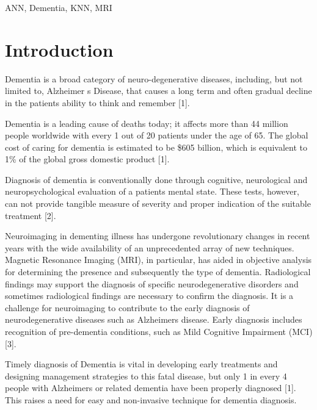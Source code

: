 \documentclass[journal,twoside]{IEEEtran}
\begin{document}
\begin{IEEEkeywords}
ANN, Dementia, KNN, MRI
\end{IEEEkeywords}


%
\IEEEpeerreviewmaketitle

\section{Introduction}
Dementia is a broad category of neuro-degenerative diseases, including, but not limited to, Alzheimer \textquotesingle s Disease, that causes a long term and often gradual decline in the patient\textquotesingle s ability to think and remember [1]. 
\par Dementia is a leading cause of deaths today; it affects more than 44 million people worldwide with every 1 out of 20 patients under the age of 65. The global cost of caring for dementia is estimated to be \$605 billion, which is equivalent to 1\% of the global gross domestic product [1].
\par Diagnosis of dementia is conventionally done through cognitive, neurological and neuropsychological evaluation of a patient\textquotesingle s mental state. These tests, however, can not provide tangible measure of severity and proper indication of the suitable treatment [2].
\par Neuroimaging in dementing illness has undergone revolutionary changes in recent years with the wide availability of an unprecedented array of new techniques. Magnetic Resonance Imaging (MRI), in particular, has aided in objective analysis for determining the presence and subsequently the type of dementia. Radiological findings may support the diagnosis of specific neurodegenerative disorders and sometimes radiological findings are necessary to confirm the diagnosis. It is a challenge for neuroimaging to contribute to the early diagnosis of neurodegenerative diseases such as Alzheimer\textquotesingle s disease. Early diagnosis includes recognition of pre-dementia conditions, such as Mild Cognitive Impairment (MCI) [3].
\par Timely diagnosis of Dementia is vital in developing early treatments and designing management strategies to this fatal disease, but only 1 in every 4 people with Alzheimer\textquotesingle s or related dementia have been properly diagnosed [1]. This raises a need for easy and non-invasive technique for dementia diagnosis.
\end{document}
